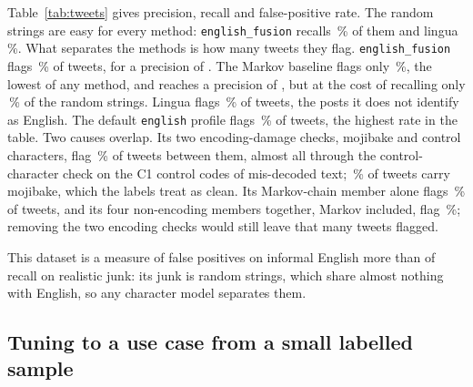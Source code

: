 \documentclass[10pt,twocolumn]{article}
\newcommand{\code}[1]{\texttt{#1}}
\newcommand{\TRS}{Tweets vs.\ Random Strings}
\begin{document}
\begin{table}[t]
\centering
\footnotesize
\caption{Precision, recall and false-positive rate on \TRS{} (\nBpos{}
random strings as junk, \nBneg{} tweets as clean), every method at its
default decision; each cell shows the value with its 95\,\% bootstrap
interval beneath. FPR is the share of tweets flagged. The two pygarble
rows are the same library run with different profiles, whose names are
set in typewriter. Lingua flags a text when the detected language is not
English. * best, ** second best per column.}
\label{tab:tweets}

\end{table}

Table~\ref{tab:tweets} gives precision, recall and false-positive rate.
The random strings are easy for every method: \code{english\_fusion}
recalls \,\% of them and lingua
\,\%. What separates the methods is how many
tweets they flag. \code{english\_fusion} flags
\,\% of tweets, for a precision of
. The Markov baseline flags only
\,\%, the lowest of any method, and
reaches a precision of , but at the
cost of recalling only \,\% of the
random strings. Lingua flags \,\% of tweets, the posts it does
not identify as English. The default \code{english} profile flags
\,\% of tweets, the highest rate in the table.
Two causes overlap. Its two encoding-damage checks, mojibake and control
characters, flag \englishencodingpct\,\% of tweets between them, almost
all through the control-character check on the C1 control codes of
mis-decoded text; \mojibakepct\,\% of tweets carry mojibake, which the
labels treat as clean. Its Markov-chain member alone flags
\englishmarkovpct\,\% of tweets, and its four non-encoding members
together, Markov included, flag \englishrestpct\,\%; removing the two
encoding checks would still leave that many tweets flagged.

This dataset is a measure of false positives on informal English more
than of recall on realistic junk: its junk is random strings, which share
almost nothing with English, so any character model separates them.

\subsection{Tuning to a use case from a small labelled sample}
\label{sec:tuning}
\end{document}
